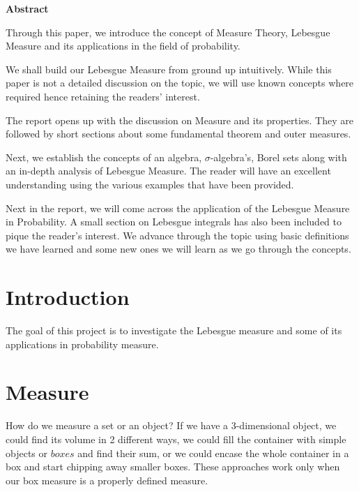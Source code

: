 \documentclass{article}
\begin{document}
\newpage

\begin{center}
    {\Large\bfseries\noindent Abstract}
\end{center}

Through this paper, we introduce the concept of Measure Theory, Lebesgue Measure and its applications in the field of probability.\bigskip

We shall build our Lebesgue Measure from ground up intuitively. While this paper is not a detailed discussion on the topic, we will use known concepts where required hence retaining the readers' interest.\bigskip

The report opens up with the discussion on Measure and its properties. They are followed by short sections about some fundamental theorem and outer measures.\bigskip

Next, we establish the concepts of an algebra, $\sigma$-algebra's, Borel sets along with an in-depth analysis of Lebesgue Measure. The reader will have an excellent understanding using the various examples that have been provided.\bigskip

Next in the report, we will come across the application of the Lebesgue Measure in Probability. A small section on Lebesgue integrals has also been included to pique the reader's interest. We advance through the topic using basic definitions we have learned and some new ones we will learn as we go through the concepts.
\newpage

\begin{center}
    \tableofcontents
\end{center}

\newpage

\section{Introduction}
The goal of this project is to investigate the Lebesgue measure and some of its applications in probability measure. 

\section{Measure}

How do we measure a set or an object? If we have a 3-dimensional object, we could find its volume in 2 different ways, we could fill the container with simple objects or $boxes$ and find their sum, or we could encase the whole container in a box and start chipping away smaller boxes. These approaches work only when our box measure is a properly defined measure.\medskip
\end{document}
